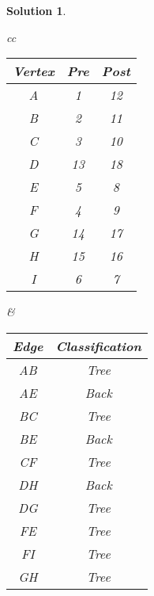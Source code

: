 \documentclass[boxes]{rutgers_hw}
\newtheorem*{solutions}{Solution}
\begin{document}
\begin{solutions}
        \begin{center}
            \begin{tabular}{cc}
                \begin{minipage}{.5\linewidth}
                    \begin{tabular}{|c|c|c|}
                        \hline
                        Vertex & Pre & Post \\
                        \hline
                        A & 1 & 12 \\
                        B & 2 & 11 \\
                        C & 3 & 10 \\
                        D & 13 & 18 \\
                        E & 5 & 8 \\
                        F & 4 & 9 \\
                        G & 14 & 17 \\
                        H & 15 & 16 \\
                        I & 6 & 7 \\
                        \hline
                    \end{tabular}
                \end{minipage} &
            
                \begin{minipage}{.5\linewidth}
                    \begin{tabular}{|c|c|}
                        \hline
                        Edge & Classification\\
                        \hline
                        AB & Tree \\
                        AE & Back \\
                        BC & Tree \\
                        BE & Back \\
                        CF & Tree \\
                        DH & Back \\
                        DG & Tree \\
                        FE & Tree \\
                        FI & Tree \\
                        GH & Tree \\
                        \hline
                    \end{tabular}
                \end{minipage} 
            \end{tabular}
        \end{center}
    \end{solutions}
\end{document}

